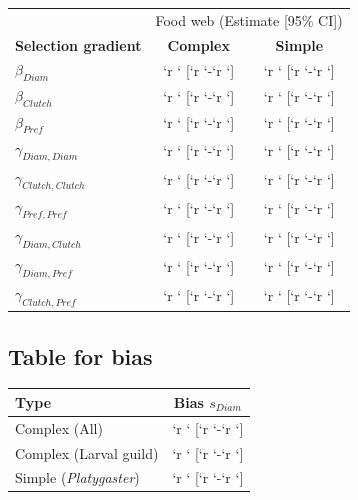 \documentclass[]{elsarticle} %
\begin{document}
\begin{table}[]
\begin{tabular}{lcc}
                                                                                  \\ \hline
                                  & \multicolumn{2}{c}{Food web (Estimate [95\% CI])} \\
\textbf{Selection gradient}       & \textbf{Complex} & \textbf{Simple}            \\ \hline
$\beta_{Diam}$                    & `r ` [`r `-`r `] & `r ` [`r `-`r `]  \\
$\beta_{Clutch}$                  & `r ` [`r `-`r `] & `r ` [`r `-`r `]  \\
$\beta_{Pref}$                    & `r ` [`r `-`r `] & `r ` [`r `-`r `]  \\
$\gamma_{Diam,Diam}$              & `r ` [`r `-`r `] & `r ` [`r `-`r `]  \\
$\gamma_{Clutch,Clutch}$          & `r ` [`r `-`r `] & `r ` [`r `-`r `]  \\
$\gamma_{Pref,Pref}$              & `r ` [`r `-`r `] & `r ` [`r `-`r `]  \\
$\gamma_{Diam,Clutch}$            & `r ` [`r `-`r `] & `r ` [`r `-`r `]  \\
$\gamma_{Diam,Pref}$              & `r ` [`r `-`r `] & `r ` [`r `-`r `]  \\
$\gamma_{Clutch,Pref}$            & `r ` [`r `-`r `] & `r ` [`r `-`r `]           \\ \hline
\end{tabular}
\end{table}

\subsection{Table for bias}\label{table-for-bias}

\begin{table}[]
\begin{tabular}{lc}
                                                                  \\ \hline
\textbf{Type}                 & \textbf{Bias} \boldmath$s_{Diam}$ \\ \hline
Complex (All)                 & `r ` [`r `-`r `]  \\
Complex (Larval guild)        & `r ` [`r `-`r `]  \\
Simple (\textit{Platygaster}) & `r ` [`r `-`r `]                  \\ \hline
\end{tabular}
\end{table}
\end{document}
